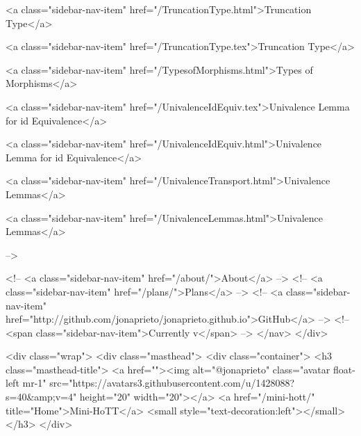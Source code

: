      
    
      
        
          <a class="sidebar-nav-item" href="/TruncationType.html">Truncation Type</a>
        
      
    
      
        
          <a class="sidebar-nav-item" href="/TruncationType.tex">Truncation Type</a>
        
      
    
      
        
          <a class="sidebar-nav-item" href="/TypesofMorphisms.html">Types of Morphisms</a>
        
      
    
      
        
          <a class="sidebar-nav-item" href="/UnivalenceIdEquiv.tex">Univalence Lemma for id Equivalence</a>
        
      
    
      
        
          <a class="sidebar-nav-item" href="/UnivalenceIdEquiv.html">Univalence Lemma for id Equivalence</a>
        
      
    
      
        
          <a class="sidebar-nav-item" href="/UnivalenceTransport.html">Univalence Lemmas</a>
        
      
    
      
        
          <a class="sidebar-nav-item" href="/UnivalenceLemmas.html">Univalence Lemmas</a>
        
      
     -->

    <!-- <a class="sidebar-nav-item" href="/about/">About</a> -->
    <!-- <a class="sidebar-nav-item" href="/plans/">Plans</a> -->
    <!-- <a class="sidebar-nav-item" href="http://github.com/jonaprieto/jonaprieto.github.io">GitHub</a> -->
    <!-- <span class="sidebar-nav-item">Currently v</span> -->
  </nav>
</div>

    <div class="wrap">
      <div class="masthead">
        <div class="container">
          <h3 class="masthead-title">
            <a href=""><img alt="@jonaprieto" class="avatar float-left mr-1" src="https://avatars3.githubusercontent.com/u/1428088?s=40&amp;v=4" height="20" width="20"></a>
            <a href="/mini-hott/" title="Home">Mini-HoTT</a>
            <small style="text-decoration:left"></small>
          </h3>
        </div>
      
